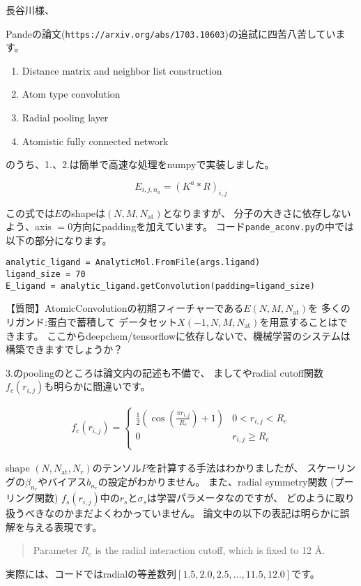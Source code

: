 \documentclass{jarticle}
\begin{document}
\thispagestyle{empty}

長谷川様、

\vspace{1cm}

Pandeの論文(\texttt{https://arxiv.org/abs/1703.10603})の追試に四苦八苦しています。

\begin{enumerate}
  \item Distance matrix and neighbor list construction
  \vspace{-3mm}
  \item Atom type convolution
  \vspace{-3mm}
  \item Radial pooling layer
  \vspace{-3mm}
  \item Atomistic fully connected network
\end{enumerate}

のうち、1.、2.は簡単で高速な処理をnumpyで実装しました。

\[
E_{i,j,n_a} = (K^a*R)_{i,j}
\]

この式では$E$のshapeは$(N, M, N_{\mathrm{at}})$となりますが、
分子の大きさに依存しないよう、axis $=0$方向にpaddingを加えています。
コード\texttt{pande\_aconv.py}の中では以下の部分になります。

\begin{verbatim}
analytic_ligand = AnalyticMol.FromFile(args.ligand)
ligand_size = 70
E_ligand = analytic_ligand.getConvolution(padding=ligand_size)
\end{verbatim}

【質問】AtomicConvolutionの初期フィーチャーである$E(N, M, N_{\textrm{at}})$を
多くのリガンド:蛋白で蓄積して
データセット$X(-1, N, M, N_{\textrm{at}})$を用意することはできます。
ここからdeepchem/tensorflowに依存しないで、機械学習のシステムは構築できますでしょうか？
\vspace{.5cm}

3.のpoolingのところは論文内の記述も不備で、
ましてやradial cutoff関数$f_c(r_{i,j})$も明らかに間違いです。

\begin{eqnarray}
  f_c(r_{i,j}) = \left\{
      \begin{array}{ll}
      \frac12\left(\cos\left(\frac{\pi r_{i,j}}{R_c}\right) + 1\right) & 0 < r_{i,j} < R_c \\
      0 & r_{i,j} \geq R_c \\
      \end{array} \right.
\end{eqnarray}

shape $(N, N_{\mathrm{at}}, N_r)$のテンソル$P$を計算する手法はわかりましたが、
スケーリングの$\beta_{n_r}$やバイアス$b_{n_r}$の設定がわかりません。
また、radial symmetry関数 (プーリング関数) $f_s(r_{i,j})$中の$r_s$と$\sigma_s$は学習パラメータなのですが、
どのように取り扱うべきなのかまだよくわかっていません。
論文中の以下の表記は明らかに誤解を与える表現です。

\begin{quote}
Parameter $R_c$ is the radial interaction cutoff, which is fixed to 12 \AA.
\end{quote}

実際には、コードではradialの等差数列$[1.5, 2.0, 2.5, ..., 11.5, 12.0]$です。
\end{document}

